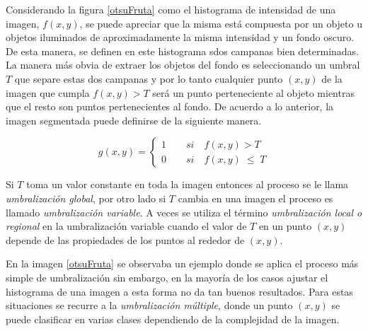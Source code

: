 Considerando la figura \ref{otsuFruta} como el histograma de intensidad de una imagen, $f(x,y)$, se puede apreciar que la misma está compuesta por un objeto u objetos iluminados de aproximadamente la misma intensidad y un fondo oscuro. De esta manera, se definen en este histograma sdos campanas bien determinadas. La manera más obvia de extraer los objetos del fondo es seleccionando un umbral $T$ que separe estas dos campanas y por lo tanto cualquier punto $(x,y)$ de la imagen que cumpla $f(x,y) > T$ será un punto perteneciente al objeto mientras que el resto son puntos pertenecientes al fondo. De acuerdo a lo anterior, la imagen segmentada puede definirse de la siguiente manera.

\begin{equation}
g(x,y) = \left\{
\begin{array}{l}
\displaystyle 1{\qquad}si{\quad}f(x,y) > T\\
\displaystyle 0{\qquad}si{\quad}f(x,y)\;{\leq}\;T
\end{array} 
\right.
\label{eq:xdef}
\end{equation}

Si $T$ toma un valor constante en toda la imagen entonces al proceso se le llama \textit{umbralización global}, por otro lado si $T$ cambia en una imagen el proceso es llamado \textit{umbralización variable}. A veces se utiliza el término \textit{umbralización local o regional} en la umbralización variable cuando el valor de $T$ en un punto $(x,y)$ depende de las propiedades de los puntos al rededor de $(x,y)$.

En la imagen \ref{otsuFruta} se observaba un ejemplo donde se aplica el proceso más simple de umbralización sin embargo, en la mayoría de los casos ajustar el histograma de una imagen a esta forma no da tan buenos resultados. Para estas situaciones se recurre a la \textit{umbralización múltiple}, donde un punto $(x,y)$ se puede clasificar en varias clases dependiendo de la complejidad de la imagen.

